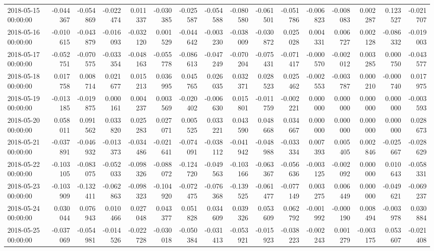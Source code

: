 \begin{tabular}{lrrrrrrrrrrrrrrr}
2018-05-15 00:00:00 & -0.044367 & -0.054869 & -0.022474 & 0.011337 & -0.030385 & -0.025587 & -0.054588 & -0.080580 & -0.061501 & -0.051786 & -0.006823 & -0.008083 & 0.002287 & 0.123527 & -0.021707 \\
2018-05-16 00:00:00 & -0.010615 & -0.043879 & -0.016093 & -0.032120 & 0.001529 & -0.044642 & -0.003230 & -0.038009 & -0.030872 & 0.025028 & 0.004331 & 0.006727 & 0.002128 & -0.086332 & -0.019003 \\
2018-05-17 00:00:00 & -0.052751 & -0.070575 & -0.033354 & -0.048163 & -0.055778 & -0.086613 & -0.047249 & -0.070204 & -0.075431 & -0.071417 & -0.000570 & -0.002012 & 0.003285 & 0.000750 & -0.043577 \\
2018-05-18 00:00:00 & 0.017758 & 0.008714 & 0.021677 & 0.015213 & 0.036995 & 0.045765 & 0.026035 & 0.032371 & 0.028523 & 0.025462 & -0.002553 & -0.003787 & 0.000210 & -0.000740 & 0.017975 \\
2018-05-19 00:00:00 & -0.013185 & -0.019875 & 0.000161 & 0.004237 & 0.003569 & -0.020402 & -0.006630 & 0.015801 & -0.011759 & -0.002221 & 0.000000 & 0.000000 & 0.000000 & 0.000000 & -0.003593 \\
2018-05-20 00:00:00 & 0.058011 & 0.091562 & 0.033820 & 0.025283 & 0.027071 & 0.005525 & 0.033221 & 0.043590 & 0.048668 & 0.034667 & 0.000000 & 0.000000 & 0.000000 & 0.000000 & 0.028673 \\
2018-05-21 00:00:00 & -0.037891 & -0.046932 & -0.013373 & -0.034486 & -0.021641 & -0.074091 & -0.038112 & -0.041942 & -0.048988 & -0.033334 & 0.007393 & 0.005405 & 0.002846 & -0.025667 & -0.028629 \\
2018-05-22 00:00:00 & -0.103105 & -0.083075 & -0.052033 & -0.098326 & -0.088072 & -0.124720 & -0.049563 & -0.103166 & -0.063367 & -0.056636 & -0.003125 & -0.002092 & 0.000000 & 0.010643 & -0.058331 \\
2018-05-23 00:00:00 & -0.103909 & -0.132411 & -0.062863 & -0.098323 & -0.104920 & -0.072475 & -0.076368 & -0.139525 & -0.061477 & -0.077149 & 0.003275 & 0.006449 & 0.000000 & -0.049621 & -0.069237 \\
2018-05-24 00:00:00 & 0.030044 & 0.076943 & 0.010466 & 0.027048 & 0.043377 & 0.051828 & 0.034609 & 0.039326 & 0.053609 & 0.062792 & -0.001992 & -0.000190 & 0.008494 & -0.003978 & 0.030884 \\
2018-05-25 00:00:00 & -0.037069 & -0.054981 & -0.014526 & -0.022728 & -0.030018 & -0.050384 & -0.031413 & -0.053921 & -0.015923 & -0.038223 & -0.002243 & 0.001279 & -0.003175 & 0.053607 & -0.021408 \\

\end{tabular}
